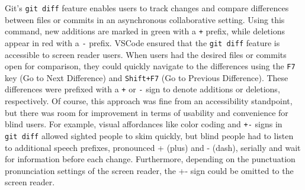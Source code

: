 \documentclass[sigconf]{acmart}
\begin{document}
Git's \texttt{git\ diff} feature enables users to track changes and
compare differences between files or commits in an asynchronous
collaborative setting. Using this command, new additions are marked in
green with a \texttt{+} prefix, while deletions appear in red with a
\texttt{-} prefix. VSCode ensured that the \texttt{git\ diff} feature is
accessible to screen reader users. When users had the desired files or
commits open for comparison, they could quickly navigate to the
differences using the \texttt{F7} key (Go to Next Difference) and
\texttt{Shift+F7} (Go to Previous Difference). These differences were
prefixed with a \texttt{+} or \texttt{-} sign to denote additions or
deletions, respectively. Of course, this approach was fine from an
accessibility standpoint, but there was room for improvement in terms of
usability and convenience for blind users. For example, visual
affordances like color coding and \texttt{+-} signs in
\texttt{git\ diff} allowed sighted people to skim quickly, but blind
people had to listen to additional speech prefixes, pronounced + (plus)
and - (dash), serially and wait for information before each change.
Furthermore, depending on the punctuation pronunciation settings of the
screen reader, the +- sign could be omitted to the screen reader.
\end{document}
